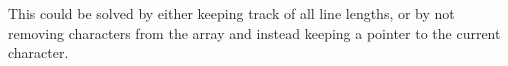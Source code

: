 \documentclass[a4paper,titlepage]{article}
\numberwithin{equation}{section} %
\begin{document}
	This could be solved by either keeping track of all line lengths, or by not removing characters from the array and instead keeping a pointer to the current character.
	\newpage
	
	
	
	
	
	
\end{document}
